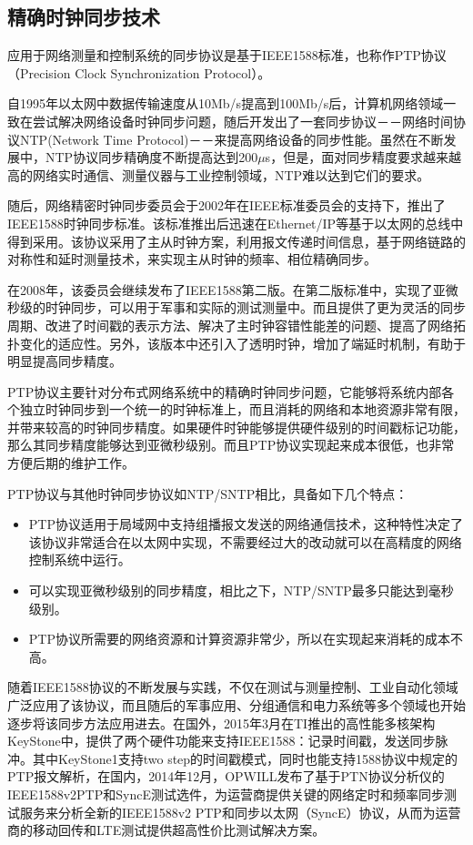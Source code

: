 \subsection{精确时钟同步技术}
应用于网络测量和控制系统的同步协议是基于IEEE1588标准，也称作PTP协议（Precision Clock Synchronization Protocol）。

自1995年以太网中数据传输速度从10Mb/s提高到100Mb/s后，计算机网络领域一致在尝试解决网络设备时钟同步问题，随后开发出了一套同步协议－－网络时间协议NTP(Network Time Protocol)－－来提高网络设备的同步性能。虽然在不断发展中，NTP协议同步精确度不断提高达到200$\mu$s，但是，面对同步精度要求越来越高的网络实时通信、测量仪器与工业控制领域，NTP难以达到它们的要求。

随后，网络精密时钟同步委员会于2002年在IEEE标准委员会的支持下，推出了IEEE1588时钟同步标准。该标准推出后迅速在Ethernet/IP等基于以太网的总线中得到采用。该协议采用了主从时钟方案，利用报文传递时间信息，基于网络链路的对称性和延时测量技术，来实现主从时钟的频率、相位精确同步。

在2008年，该委员会继续发布了IEEE1588第二版。在第二版标准中，实现了亚微秒级的时钟同步，可以用于军事和实际的测试测量中。而且提供了更为灵活的同步周期、改进了时间戳的表示方法、解决了主时钟容错性能差的问题、提高了网络拓扑变化的适应性。另外，该版本中还引入了透明时钟，增加了端延时机制，有助于明显提高同步精度。

PTP协议主要针对分布式网络系统中的精确时钟同步问题，它能够将系统内部各个独立时钟同步到一个统一的时钟标准上，而且消耗的网络和本地资源非常有限，并带来较高的时钟同步精度。如果硬件时钟能够提供硬件级别的时间戳标记功能，那么其同步精度能够达到亚微秒级别。而且PTP协议实现起来成本很低，也非常方便后期的维护工作。

PTP协议与其他时钟同步协议如NTP/SNTP相比，具备如下几个特点：
\begin{itemize}[noitemsep,topsep=0pt,parsep=0pt,partopsep=0pt]
	\item PTP协议适用于局域网中支持组播报文发送的网络通信技术，这种特性决定了该协议非常适合在以太网中实现，不需要经过大的改动就可以在高精度的网络控制系统中运行。
	\item 可以实现亚微秒级别的同步精度，相比之下，NTP/SNTP最多只能达到毫秒级别。
	\item PTP协议所需要的网络资源和计算资源非常少，所以在实现起来消耗的成本不高。
\end{itemize}

随着IEEE1588协议的不断发展与实践，不仅在测试与测量控制、工业自动化领域广泛应用了该协议，而且随后的军事应用、分组通信和电力系统等多个领域也开始逐步将该同步方法应用进去。在国外，2015年3月在TI推出的高性能多核架构KeyStone中，提供了两个硬件功能来支持IEEE1588：记录时间戳，发送同步脉冲。其中KeyStone1支持two step的时间戳模式，同时也能支持1588协议中规定的PTP报文解析，在国内，2014年12月，OPWILL发布了基于PTN协议分析仪的IEEE1588v2PTP和SyncE测试选件，为运营商提供关键的网络定时和频率同步测试服务来分析全新的IEEE1588v2 PTP和同步以太网（SyncE）协议，从而为运营商的移动回传和LTE测试提供超高性价比测试解决方案。

